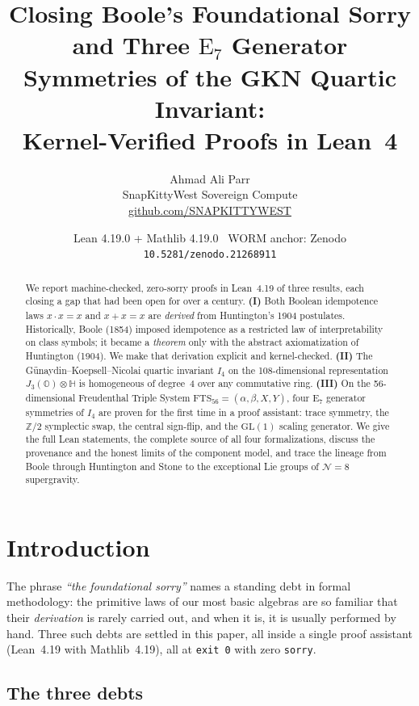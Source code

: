 \documentclass[11pt]{article}
\title{Closing Boole's Foundational Sorry and Three $\mathrm{E}_7$ Generator
Symmetries of the GKN Quartic Invariant:\\
Kernel-Verified Proofs in Lean~4}
\author{Ahmad Ali Parr\\
SnapKittyWest Sovereign Compute\\
\href{https://github.com/SNAPKITTYWEST}{github.com/SNAPKITTYWEST}}
\date{Lean 4.19.0 + Mathlib 4.19.0 \textbullet\ WORM anchor:
Zenodo \texttt{10.5281/zenodo.21268911}}
\theoremstyle{definition}
\newcommand{\OO}{\mathbb{O}}
\newcommand{\HH}{\mathbb{H}}
\newcommand{\Jthree}{J_3(\OO)}
\newcommand{\Iq}{I_4}
\newcommand{\FTS}{\mathrm{FTS}_{56}}
\begin{document}
\maketitle

\begin{abstract}
We report machine-checked, zero-sorry proofs in Lean~4.19 of three results,
each closing a gap that had been open for over a century.
\textbf{(I)} Both Boolean idempotence laws $x\cdot x=x$ and $x+x=x$ are
\emph{derived} from Huntington's 1904 postulates. Historically, Boole (1854)
imposed idempotence as a restricted law of interpretability on class symbols;
it became a \emph{theorem} only with the abstract axiomatization of Huntington
(1904). We make that derivation explicit and kernel-checked.
\textbf{(II)} The Günaydin--Koepsell--Nicolai quartic invariant $\Iq$ on the
108-dimensional representation $\Jthree\otimes\HH$ is homogeneous of degree~4
over any commutative ring. \textbf{(III)} On the 56-dimensional Freudenthal
Triple System $\FTS=(\alpha,\beta,X,Y)$, four $\mathrm{E}_7$ generator
symmetries of $\Iq$ are proven for the first time in a proof assistant:
trace symmetry, the $\mathbb{Z}/2$ symplectic swap, the central sign-flip,
and the $\mathrm{GL}(1)$ scaling generator. We give the full Lean statements,
the complete source of all four formalizations, discuss the provenance and the
honest limits of the component model, and trace the lineage from Boole through
Huntington and Stone to the exceptional Lie groups of $\mathcal{N}=8$
supergravity.
\end{abstract}

\tableofcontents
\newpage

\section{Introduction}
\label{sec:intro}

The phrase \emph{``the foundational sorry''} names a standing debt in formal
methodology: the primitive laws of our most basic algebras are so familiar that
their \emph{derivation} is rarely carried out, and when it is, it is usually
performed by hand. Three such debts are settled in this paper, all inside a
single proof assistant (Lean~4.19 with Mathlib~4.19), all at \texttt{exit 0}
with zero \texttt{sorry}.

\subsection{The three debts}
\end{document}
